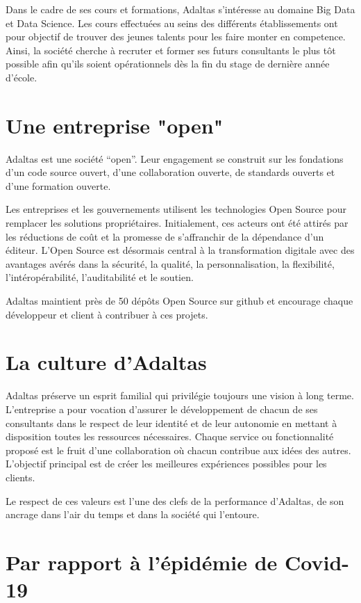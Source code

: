 \documentclass[12pt, french]{report}
\begin{document}
Dans le cadre de ses cours et formations, Adaltas s'intéresse au domaine Big Data et Data Science. Les cours effectuées au seins des différents établissements ont pour objectif de trouver des jeunes talents pour les faire monter en competence. Ainsi, la société cherche à recruter et former ses futurs consultants le plus tôt possible afin qu'ils soient opérationnels dès la fin du stage de dernière année d'école.

\section{Une entreprise "open"}

Adaltas est une société “open”. Leur engagement se construit sur les fondations d’un code source ouvert, d’une collaboration ouverte, de standards ouverts et d’une formation ouverte.

Les entreprises et les gouvernements utilisent les technologies Open Source pour remplacer les solutions propriétaires. Initialement, ces acteurs ont été attirés par les réductions de coût et la promesse de s’affranchir de la dépendance d’un éditeur. L’Open Source est désormais central à la transformation digitale avec des avantages avérés dans la sécurité, la qualité, la personnalisation, la flexibilité, l’intéropérabilité, l’auditabilité et le soutien.

Adaltas maintient près de 50 dépôts Open Source sur \gls{github} et encourage chaque développeur et client à contribuer à ces projets.

\section{La culture d'Adaltas}

Adaltas préserve un esprit familial qui privilégie toujours une vision à long terme. L'entreprise a pour vocation d’assurer le développement de chacun de ses consultants dans le respect de leur identité et de leur autonomie en mettant à disposition toutes les ressources nécessaires. Chaque service ou fonctionnalité proposé est le fruit d’une collaboration où chacun contribue aux idées des autres. L'objectif principal est de créer les meilleures expériences possibles pour les clients.

Le respect de ces valeurs est l’une des clefs de la performance d'Adaltas, de son ancrage dans l’air du temps et dans la société qui l'entoure.

\section{Par rapport à l'épidémie de Covid-19}
\end{document}
